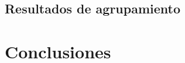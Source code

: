 \documentclass{article}
\begin{document}
    \newpage

    \subsection{Resultados de agrupamiento}
        

\section{Conclusiones}

        

        

        
    
\newpage
{} %
\printbibliography
\end{document}
